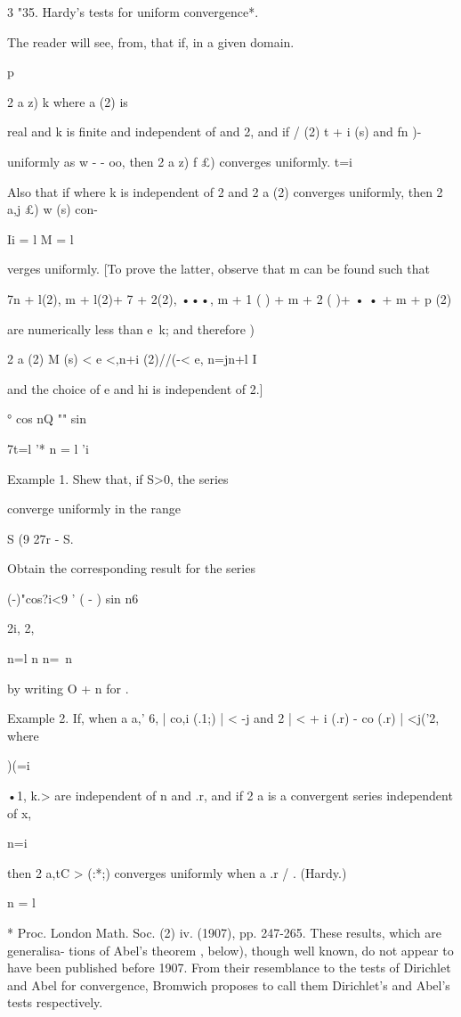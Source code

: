 3 "35. Hardy's tests for uniform convergence*.

The reader will see, from, that if, in a given domain.

p

2 a z) k where a (2) is

real and k is finite and independent of and 2, and if / (2) t + i (s)
and fn )-

uniformly as w - - oo, then 2 a z) f £) converges uniformly. t=i

Also that if where k is independent of 2 and 2 a (2) converges
uniformly, then 2 a,j £) w (s) con-

Ii = l M = l

verges uniformly. [To prove the latter, observe that m can be found
such that

 7n + l(2), m + l(2)+ 7 + 2(2), •••, m + 1 ( ) + m + 2 ( )+ • • + m +
p (2)

are numerically less than e\ k; and therefore )

2 a (2) M (s) < e <,n+i (2)//(-< e, n=jn+l I

and the choice of e and hi is independent of 2.]

° cos nQ "" sin %

7t=l '* n = l 'i

Example 1. Shew that, if S>0, the series

converge uniformly in the range

S (9 27r - S.

Obtain the corresponding result for the series

  (-)"cos?i<9 ' ( - ) sin n6

2i, 2,

n=l n n=\ n

by writing O + n for .

Example 2. If, when a a,' 6, | co,i (.1;) | < -j and 2 | < + i (.r) -
co (.r) | <j('2, where

)(=i

 •1, k.> are independent of n and .r, and if 2 a is a convergent
series independent of x,

n=i

then 2 a,tC > (:*;) converges uniformly when a .r / . (Hardy.)

n = l

* Proc. London Math. Soc. (2) iv. (1907), pp. 247-265. These results,
which are generalisa- tions of Abel's theorem , below), though
well known, do not appear to have been published before 1907. From
their resemblance to the tests of Dirichlet and Abel for convergence,
Bromwich proposes to call them Dirichlet's and Abel's tests
respectively.

